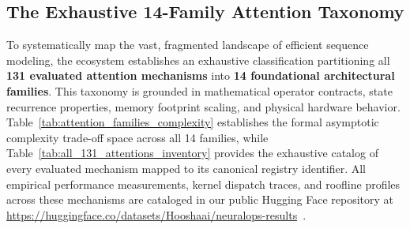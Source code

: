 \subsection{The Exhaustive 14-Family Attention Taxonomy}
\label{subsec:14_families_taxonomy}

To systematically map the vast, fragmented landscape of efficient sequence modeling, the \neuralops{} ecosystem establishes an exhaustive classification partitioning all \textbf{131 evaluated attention mechanisms} into \textbf{14 foundational architectural families}. This taxonomy is grounded in mathematical operator contracts, state recurrence properties, memory footprint scaling, and physical hardware behavior. Table~\ref{tab:attention_families_complexity} establishes the formal asymptotic complexity trade-off space across all 14 families, while Table~\ref{tab:all_131_attentions_inventory} provides the exhaustive catalog of every evaluated mechanism mapped to its canonical registry identifier. All empirical performance measurements, kernel dispatch traces, and roofline profiles across these mechanisms are cataloged in our public Hugging Face repository at \url{https://huggingface.co/datasets/Hooshaai/neuralops-results}~\cite{neuralops_results_hf}.

